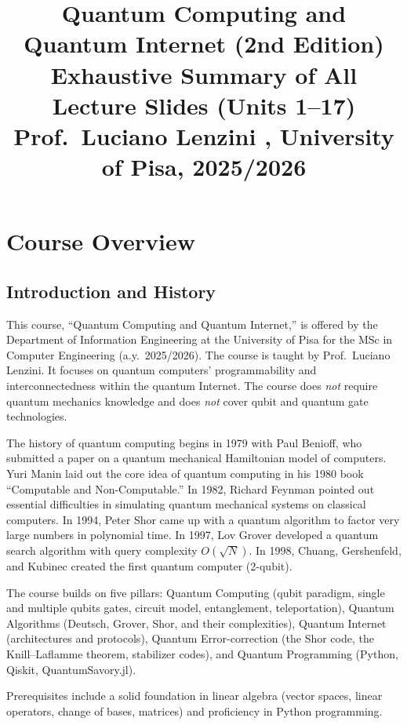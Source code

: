 \documentclass[10pt,a4paper]{article}
\title{\textbf{Quantum Computing and Quantum Internet} (2nd Edition)\\[4pt]
\large Exhaustive Summary of All Lecture Slides (Units 1--17)\\
Prof.\ Luciano Lenzini ,  University of Pisa, 2025/2026}
\author{}
\date{}
\begin{document}
\maketitle
\tableofcontents
\newpage

\section{Course Overview}

\subsection{Introduction and History}

This course, ``Quantum Computing and Quantum Internet,'' is offered by the Department of Information Engineering at the University of Pisa for the MSc in Computer Engineering (a.y.\ 2025/2026). The course is taught by Prof.\ Luciano Lenzini. It focuses on quantum computers' programmability and interconnectedness within the quantum Internet. The course does \emph{not} require quantum mechanics knowledge and does \emph{not} cover qubit and quantum gate technologies.

The history of quantum computing begins in 1979 with Paul Benioff, who submitted a paper on a quantum mechanical Hamiltonian model of computers. Yuri Manin laid out the core idea of quantum computing in his 1980 book ``Computable and Non-Computable.'' In 1982, Richard Feynman pointed out essential difficulties in simulating quantum mechanical systems on classical computers. In 1994, Peter Shor came up with a quantum algorithm to factor very large numbers in polynomial time. In 1997, Lov Grover developed a quantum search algorithm with query complexity $O(\sqrt{N})$. In 1998, Chuang, Gershenfeld, and Kubinec created the first quantum computer (2-qubit).

The course builds on five pillars: Quantum Computing (qubit paradigm, single and multiple qubits gates, circuit model, entanglement, teleportation), Quantum Algorithms (Deutsch, Grover, Shor, and their complexities), Quantum Internet (architectures and protocols), Quantum Error-correction (the Shor code, the Knill--Laflamme theorem, stabilizer codes), and Quantum Programming (Python, Qiskit, QuantumSavory.jl).

Prerequisites include a solid foundation in linear algebra (vector spaces, linear operators, change of bases, matrices) and proficiency in Python programming.
\end{document}

